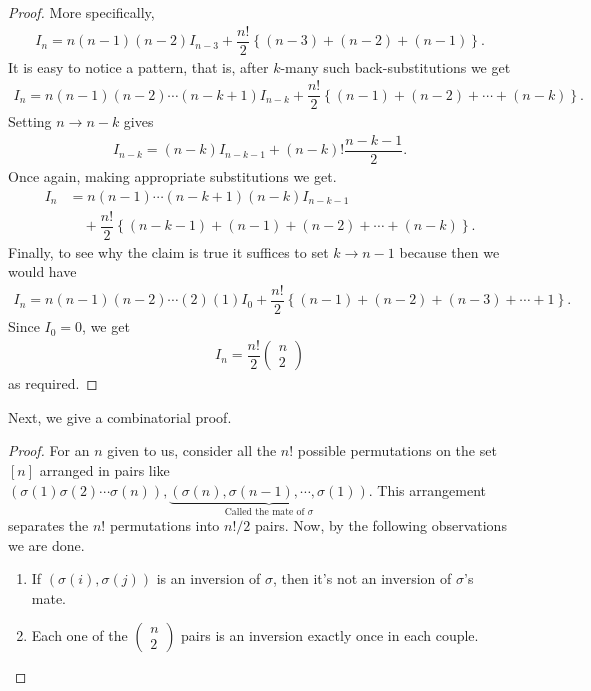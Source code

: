 \begin{proof}
More specifically,
\begin{align*}
	I_n = n(n-1)(n-2)I_{n-3} + \dfrac{n!}{2}\left\{(n-3)+(n-2)+(n-1)\right\}.
\end{align*}
It is easy to notice a pattern, that is, after $k$-many such back-substitutions we get
\begin{align*}
	I_n = n(n-1)(n-2)\cdots(n-k+1)I_{n-k} + \dfrac{n!}{2}\left\{(n-1)+(n-2)+\cdots+(n-k)\right\}.
\end{align*}
Setting $n\to n-k$ gives
\begin{align*}
	I_{n-k}=(n-k)I_{n-k-1} + (n-k)!\dfrac{n-k-1}{2}.
\end{align*}
Once again, making appropriate substitutions we get.
\begin{align*}
I_n &= n(n-1)\cdots(n-k+1)(n-k)I_{n-k-1}\\ &\quad +\dfrac{n!}{2}\left\{(n-k-1)+(n-1)+(n-2)+\cdots+(n-k)\right\}.
\end{align*}
Finally, to see why the claim is true it suffices to set $k\to n-1$ because then we would have 
\begin{align*}
	I_n = n(n-1)(n-2)\cdots (2)(1)I_{0} + \dfrac{n!}{2}\left\{ (n-1)+(n-2)+(n-3)+\cdots+1\right\}.
\end{align*}
Since $I_0=0$, we get
\begin{align*}
	I_n = \dfrac{n!}{2}\left(\begin{array}{c}n\\ 2\end{array}\right) 
\end{align*}
as required. 
\end{proof}
Next, we give a combinatorial proof. 
\begin{proof}
For an $n$ given to us, consider all the $n!$ possible permutations on the set $[n]$ arranged in pairs like $(\sigma(1)\sigma(2)\cdots\sigma(n)), \underbrace{(\sigma(n),\sigma(n-1),\cdots,\sigma(1))}_{\text{Called the mate of } \sigma}$. This arrangement separates the $n!$ permutations into $n!/2$ pairs. Now, by the following observations we are done.
\begin{enumerate}
	\item If $(\sigma(i),\sigma(j))$ is an inversion of $\sigma$, then it's not an inversion of $\sigma$'s mate.
	\item Each one of the $\left(\begin{array}{c}n\\ 2\end{array}\right)$ pairs is an inversion exactly once in each couple.
\end{enumerate}
\end{proof}
